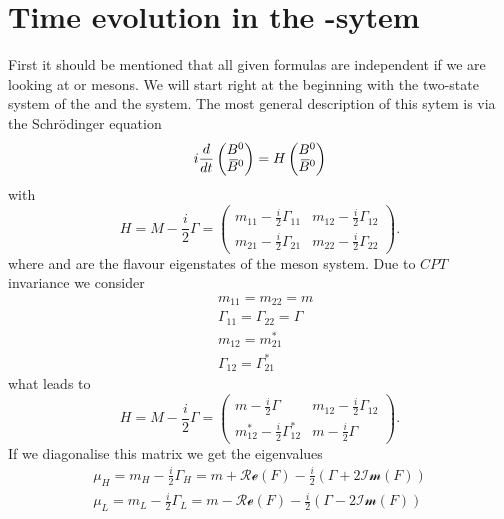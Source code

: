 \section{Time evolution in the \Bz-\Bzb sytem}

First it should be mentioned that all given formulas are independent if we are looking at \Bz or \Bs mesons. We will start right at the beginning with the two-state system of the \Bz and the \Bzb system. The most general description of this sytem is via
the Schrödinger equation
\begin{equation}
i\frac{d}{dt}\begin{pmatrix} B^0 \\ \kern 0.18em\overline{\kern -0.18em B}{}^0 \end{pmatrix} = H \begin{pmatrix} B^0 \\ \kern 0.18em\overline{\kern -0.18em B}{}^0 \end{pmatrix}
\end{equation}
with
\begin{equation}
    H = M-\frac{i}{2}\Gamma = \begin{pmatrix} m_{11}-\frac{i}{2}\Gamma_{11} & m_{12}-\frac{i}{2}\Gamma_{12} \\
                                              m_{21}-\frac{i}{2}\Gamma_{21} & m_{22}-\frac{i}{2}\Gamma_{22} \end{pmatrix}.
\end{equation}
where \Bz and \Bzb are the flavour eigenstates of the \B meson system. Due to $CPT$ invariance we consider
\begin{align}
    &m_{11} = m_{22} = m\\
    &\Gamma_{11} = \Gamma_{22} = \Gamma\\
    &m_{12} = m_{21}^*\\
    &\Gamma_{12} = \Gamma_{21}^*
\end{align}
what leads to
\begin{equation}
    H = M-\frac{i}{2}\Gamma = \begin{pmatrix} m-\frac{i}{2}\Gamma & m_{12}-\frac{i}{2}\Gamma_{12} \\
                                              m_{12}^*-\frac{i}{2}\Gamma_{12}^* & m-\frac{i}{2}\Gamma \end{pmatrix}.
\end{equation}
If we diagonalise this matrix we get the eigenvalues
\begin{align}
    \mu_H = m_H-\frac{i}{2}\Gamma_H = m+\mathcal{Re}(F)-\frac{i}{2}\left(\Gamma + 2\mathcal{Im}(F)\right)\\
    \mu_L = m_L-\frac{i}{2}\Gamma_L = m-\mathcal{Re}(F)-\frac{i}{2}\left(\Gamma - 2\mathcal{Im}(F)\right)
\end{align}
